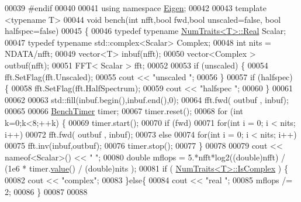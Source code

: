 \begin{DoxyCode}
00039 \textcolor{preprocessor}{#endif}
00040 
00041 \textcolor{keyword}{using namespace }\hyperlink{namespace_eigen}{Eigen};
00042 
00043 \textcolor{keyword}{template} <\textcolor{keyword}{typename} T>
00044 \textcolor{keywordtype}{void} bench(\textcolor{keywordtype}{int} nfft,\textcolor{keywordtype}{bool} fwd,\textcolor{keywordtype}{bool} unscaled=\textcolor{keyword}{false}, \textcolor{keywordtype}{bool} halfspec=\textcolor{keyword}{false})
00045 \{
00046     \textcolor{keyword}{typedef} \textcolor{keyword}{typename} \hyperlink{group___core___module_struct_eigen_1_1_num_traits}{NumTraits<T>::Real} Scalar;
00047     \textcolor{keyword}{typedef} \textcolor{keyword}{typename} std::complex<Scalar> Complex;
00048     \textcolor{keywordtype}{int} nits = NDATA/nfft;
00049     vector<T> inbuf(nfft);
00050     vector<Complex > outbuf(nfft);
00051     FFT< Scalar > fft;
00052 
00053     \textcolor{keywordflow}{if} (unscaled) \{
00054         fft.SetFlag(fft.Unscaled);
00055         cout << \textcolor{stringliteral}{"unscaled "};
00056     \}
00057     \textcolor{keywordflow}{if} (halfspec) \{
00058         fft.SetFlag(fft.HalfSpectrum);
00059         cout << \textcolor{stringliteral}{"halfspec "};
00060     \}
00061 
00062 
00063     std::fill(inbuf.begin(),inbuf.end(),0);
00064     fft.fwd( outbuf , inbuf);
00065 
00066     \hyperlink{class_eigen_1_1_bench_timer}{BenchTimer} timer;
00067     timer.reset();
00068     \textcolor{keywordflow}{for} (\textcolor{keywordtype}{int} k=0;k<8;++k) \{
00069         timer.start();
00070         \textcolor{keywordflow}{if} (fwd)
00071             \textcolor{keywordflow}{for}(\textcolor{keywordtype}{int} i = 0; i < nits; i++)
00072                 fft.fwd( outbuf , inbuf);
00073         \textcolor{keywordflow}{else}
00074             \textcolor{keywordflow}{for}(\textcolor{keywordtype}{int} i = 0; i < nits; i++)
00075                 fft.inv(inbuf,outbuf);
00076         timer.stop();
00077     \}
00078 
00079     cout << nameof<Scalar>() << \textcolor{stringliteral}{" "};
00080     \textcolor{keywordtype}{double} mflops = 5.*nfft*log2((\textcolor{keywordtype}{double})nfft) / (1e6 * timer.\hyperlink{class_eigen_1_1_bench_timer_a26760f963ed8b64c126159bfea57735e}{value}() / (double)nits );
00081     \textcolor{keywordflow}{if} ( \hyperlink{group___core___module_struct_eigen_1_1_num_traits}{NumTraits<T>::IsComplex} ) \{
00082         cout << \textcolor{stringliteral}{"complex"};
00083     \}\textcolor{keywordflow}{else}\{
00084         cout << \textcolor{stringliteral}{"real   "};
00085         mflops /= 2;
00086     \}
00087 
00088 

\end{DoxyCode}
